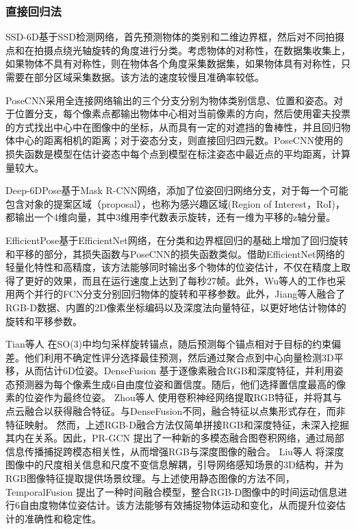 \subsubsection{直接回归法}\label{直接回归法}

\par SSD-6D\cite{ssd6d}基于SSD检测网络\cite{ssd}，首先预测物体的类别和二维边界框，然后对不同拍摄点和在拍摄点绕光轴旋转的角度进行分类。考虑物体的对称性，在数据集收集上，如果物体不具有对称性，则在物体各个角度采集数据集，如果物体具有对称性，只需要在部分区域采集数据。该方法的速度较慢且准确率较低。

\par PoseCNN\cite{ycbv}采用全连接网络输出的三个分支分别为物体类别信息、位置和姿态。对于位置分支，每个像素点都输出物体中心相对当前像素的方向，然后使用霍夫投票的方式找出中心中在图像中的坐标，从而具有一定的对遮挡的鲁棒性，并且回归物体中心的距离相机的距离；对于姿态分支，则直接回归四元数。PoseCNN使用的损失函数是模型在估计姿态中每个点到模型在标注姿态中最近点的平均距离，计算量较大。

\par Deep-6DPose\cite{Deep-6DPose}基于Mask R-CNN网络\cite{maskrcnn}，添加了位姿回归网络分支，对于每一个可能包含对象的提案区域（proposal），也称为感兴趣区域(Region of Interest，RoI)，都输出一个4维向量，其中3维用李代数表示旋转，还有一维为平移的z轴分量。

\par EfficientPose\cite{bukschat2020efficientpose}基于EfficientNet网络\cite{koonce2021efficientnet}，在分类和边界框回归的基础上增加了回归旋转和平移的部分，其损失函数与PoseCNN的损失函数类似。借助EfficientNet网络的轻量化特性和高精度，该方法能够同时输出多个物体的位姿估计，不仅在精度上取得了更好的效果，而且在运行速度上达到了每秒27帧。此外，Wu等人的工作\cite{wu2018real}也采用两个并行的FCN\cite{FCN}分支分别回归物体的旋转和平移参数。此外，Jiang等人\cite{jiang2022uni6d}融合了RGB-D数据、内置的2D像素坐标编码以及深度法向量特征，以更好地估计物体的旋转和平移参数。

\par Tian等人\cite{tian2020robust} 在SO(3)中均匀采样旋转锚点，随后预测每个锚点相对于目标的约束偏差。他们利用不确定性评分选择最佳预测，然后通过聚合点到中心向量检测3D平移，从而估计6D位姿。DenseFusion\cite{wang2019densefusion} 基于逐像素融合RGB和深度特征，并利用姿态预测器为每个像素生成6自由度位姿和置信度。随后，他们选择置信度最高的像素的位姿作为最终位姿。
Zhou等人\cite{zhou2020novel} 使用卷积神经网络提取RGB特征，并将其与点云融合以获得融合特征。与DenseFusion\cite{wang2019densefusion}不同，融合特征以点集形式存在，而非特征映射。
然而，上述RGB-D融合方法仅简单拼接RGB和深度特征，未深入挖掘其内在关系。因此，PR-GCN\cite{Zhou2021PRGCNAD} 提出了一种新的多模态融合图卷积网络，通过局部信息传播捕捉跨模态相关性，从而增强RGB与深度图像的融合。
Liu等人\cite{liu2023depth} 将深度图像中的尺度相关信息和尺度不变信息解耦，引导网络感知场景的3D结构，并为RGB图像特征提取提供场景纹理。与上述使用静态图像的方法不同，TemporalFusion\cite{mu2021temporalfusion} 提出了一种时间融合模型，整合RGB-D图像中的时间运动信息进行6自由度物体位姿估计。该方法能够有效捕捉物体运动和变化，从而提升位姿估计的准确性和稳定性。

